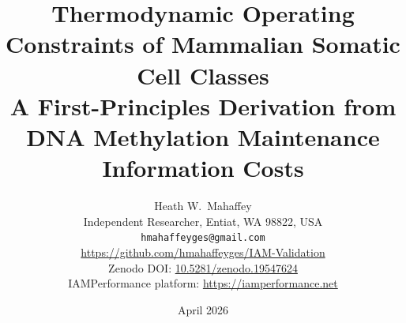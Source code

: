 \documentclass[12pt,a4paper]{article}
\begin{document}
\emergencystretch=20pt

\title{\textbf{Thermodynamic Operating Constraints of Mammalian Somatic Cell Classes}\\[6pt]
A First-Principles Derivation from DNA Methylation Maintenance Information Costs}

\author{
  Heath W.\ Mahaffey\\[4pt]
  \small Independent Researcher, Entiat, WA 98822, USA\\[2pt]
  \small \texttt{hmahaffeyges@gmail.com}\\[2pt]
  \small \url{https://github.com/hmahaffeyges/IAM-Validation}\\[1pt]
  \small Zenodo DOI: \href{https://doi.org/10.5281/zenodo.19547624}{10.5281/zenodo.19547624}\\[1pt]
  \small IAMPerformance platform: \url{https://iamperformance.net}
}

\date{April 2026}
\maketitle
\thispagestyle{empty}

\vspace{0.2cm}
\end{document}
